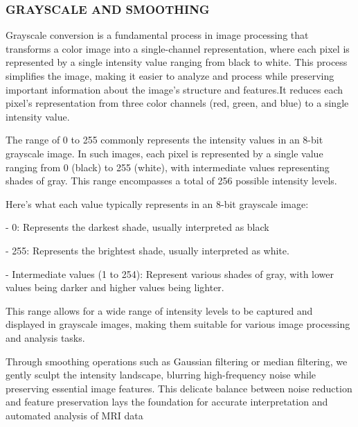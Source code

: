 \subsubsection{GRAYSCALE AND SMOOTHING}
Grayscale conversion is a fundamental process in image processing that transforms a color image into a single-channel representation, where each pixel is represented by a single intensity value ranging from black to white. This process simplifies the image, making it easier to analyze and process while preserving important information about the image's structure and features.It reduces
each pixel's representation from three color channels (red, green, and blue) to a single intensity value.

The range of 0 to 255 commonly represents the intensity values in an 8-bit grayscale image. In such images, each pixel is represented by a single value ranging from 0 (black) to 255 (white), with intermediate values representing shades of gray. This range encompasses a total of 256 possible intensity levels.

Here's what each value typically represents in an 8-bit grayscale image:

- 0: Represents the darkest shade, usually interpreted as black


- 255: Represents the brightest shade, usually interpreted as white.


- Intermediate values (1 to 254): Represent various shades of gray, with 
lower values being darker and higher values being lighter.

This range allows for a wide range of intensity levels to be captured and displayed in grayscale images, making them suitable for various image processing and analysis tasks.

Through smoothing operations such as Gaussian filtering or median filtering, we gently sculpt the intensity landscape, blurring high-frequency noise while preserving essential image features. This delicate balance between noise reduction and feature preservation lays the foundation for accurate interpretation and automated analysis of MRI data
